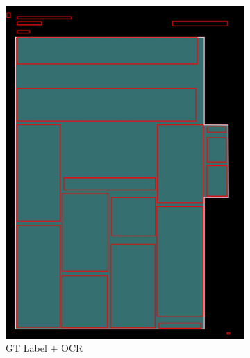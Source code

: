 \documentclass[aspectratio=1610]{beamer}
\begin{document}
\begin{frame}
\begin{figure}
\begin{subfigure}{.25\textwidth}
  \includegraphics[width=0.99\linewidth, clip=true, trim = 0mm 0mm 0mm 0mm]{figures/ocr_bbox/FZKQ4Zg.jpg}
  \caption{GT Label + OCR}
\end{subfigure}%
\begin{subfigure}{.25\textwidth}
  \centering

\end{subfigure}
\end{figure}
\end{frame}
\end{document}

